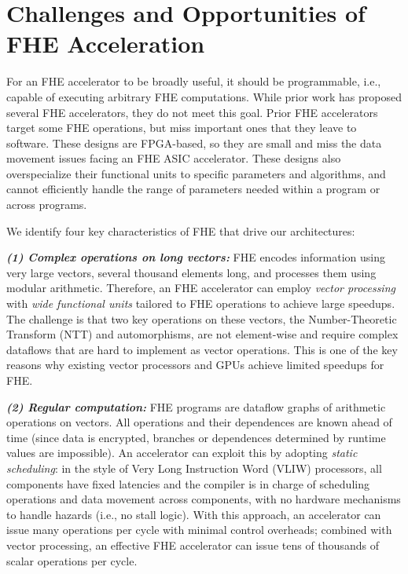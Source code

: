 \section{Challenges and Opportunities of FHE Acceleration}
\label{sec:general}

For an FHE accelerator to be broadly useful, it should be programmable, i.e.,
capable of executing arbitrary FHE computations. While prior work has proposed
several FHE accelerators, they do not meet this goal. Prior FHE
accelerators~\cite{cousins:hpec14:fpga-he,cousins:tetc17:fpga-he,doroz:tc15:accelerating-fhe,roy:hpca19:fpga-he,riazi:asplos20:heax,turan:tc20:heaws}
target some FHE operations, but miss important ones that they leave to
software. These designs are FPGA-based, so they are small and miss the data
movement issues facing an FHE ASIC accelerator. These designs also
overspecialize their functional units to specific parameters and algorithms,
and cannot efficiently handle the range of parameters needed within a program
or across programs.

We identify four key characteristics of FHE that drive our architectures:

\noindent \textbf{\emph{(1) Complex operations on long vectors:}}
FHE encodes information using very large vectors, several thousand elements
long, and processes them using modular arithmetic. Therefore, an FHE
accelerator can employ \emph{vector processing} with \emph{wide functional
units} tailored to FHE operations to achieve large speedups. The challenge is
that two key operations on these vectors, the Number-Theoretic Transform (NTT)
and automorphisms, are not element-wise and require complex dataflows that are
hard to implement as vector operations. This is one of the key reasons why
existing vector processors and GPUs achieve limited speedups for FHE.

\noindent \textbf{\emph{(2) Regular computation:}}
FHE programs are dataflow graphs of arithmetic operations on vectors. All
operations and their dependences are known ahead of time (since data is
encrypted, branches or dependences determined by runtime values are
impossible). An accelerator can exploit this by adopting \emph{static
scheduling}: in the style of Very Long Instruction Word (VLIW) processors, all
components have fixed latencies and the compiler is in charge of scheduling
operations and data movement across components, with no hardware mechanisms to
handle hazards (i.e., no stall logic). With this approach, an accelerator can
issue many operations per cycle with minimal control overheads; combined with
vector processing, an effective FHE accelerator can issue tens of thousands of
scalar operations per cycle.

